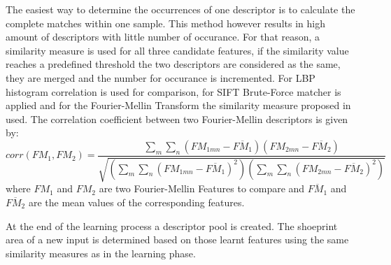 \documentclass[draft,final]{vutinfth} %
\begin{document}
\par
The easiest way to determine the occurrences of one descriptor is to calculate the complete matches within one sample.
This method however results in high amount of descriptors with little number of occurance.
For that reason, a similarity measure is used for all three candidate features, if the similarity value reaches a predefined threshold the two descriptors are considered as the same, they are merged and the number for occurance is incremented.
For LBP histogram correlation is used for comparison, for SIFT Brute-Force matcher is applied and for the Fourier-Mellin Transform the similarity measure proposed in \cite{gueham2008automatic} used.
The correlation coefficient between two Fourier-Mellin descriptors is given by:
\[ corr(FM_{1},FM_{2}) = \frac{\sum\limits_{m}\sum\limits_{n}(FM_{1mn}-\overline{FM_{1}})(FM_{2mn}-\overline{FM_{2}})}{\sqrt{(\sum\limits_{m}\sum\limits_{n}(FM_{1mn}-\overline{FM_{1}})^2)(\sum\limits_{m}\sum\limits_{n}(FM_{2mn}-\overline{FM_{2}})^2)}}  \]
\label{FMcorr}
where $FM_{1}$ and $FM_{2}$ are two Fourier-Mellin Features to compare and $\overline{FM_{1}}$ and $\overline{FM_{2}}$ are the mean values of the corresponding features.
\par
At the end of the learning process a descriptor pool is created.
The shoeprint area of a new input is determined based on those learnt features using the same similarity measures as in the learning phase.
\end{document}
